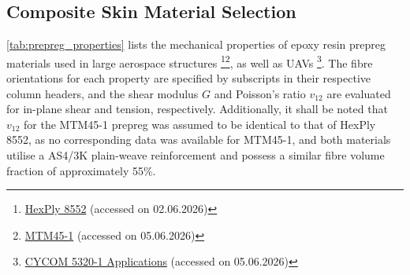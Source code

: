 \subsection{Composite Skin Material Selection}
\label{subsec:composite_material_selection}
\autoref{tab:prepreg_properties} lists the mechanical properties of epoxy resin prepreg materials used in large aerospace structures  \footnote{\label{fn:hexply}\href{https://www.hexcel.com/wp-content/uploads/2025/12/HexPly_8552_eu_DataSheet1.pdf}{HexPly 8552} (accessed on 02.06.2026)}\footnote{\label{fn:mtm}\href{https://cstjmateriauxcomposites.wordpress.com/wp-content/uploads/2017/11/cytec_mtm45-1_resine_epoxyde.pdf}{MTM45-1} (accessed on 05.06.2026)}, as well as UAVs \footnote{\href{https://www.syensqo.com/en/product/cycom-5320-1}{CYCOM 5320-1 Applications} (accessed on 05.06.2026)}. The fibre orientations for each property are specified by subscripts in their respective column headers, and the shear modulus $G$ and Poisson's ratio $v_{12}$ are evaluated for in-plane shear and tension, respectively. Additionally, it shall be noted that $v_{12}$ for the MTM45-1 prepreg was assumed to be identical to that of HexPly 8552, as no corresponding data was available for MTM45-1, and both materials utilise a AS4/3K plain-weave reinforcement and possess a similar fibre volume fraction of approximately 55\%.




